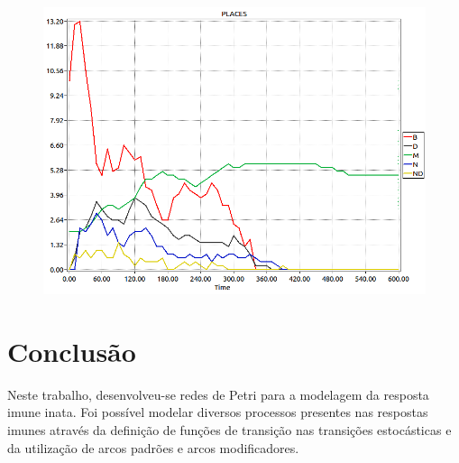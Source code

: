 \documentclass[a4paper,10pt]{article}
\begin{document}
		\begin{figure}
			\begin{center}
				\includegraphics[scale=0.45]{imagens/resultados/RedeB_N_M_D_AC_27-02_v4-Leukocytedepletion-fig1_PLACES.png}
			\end{center}
			\caption{ }
			\label{cenario3}
		\end{figure}
		
		
						
		
	\section{Conclusão}  %
	
	Neste trabalho, desenvolveu-se redes de Petri para a modelagem da resposta imune inata. Foi poss\'ivel modelar 
	diversos processos presentes nas respostas imunes atrav\'es da definiç\~ao de funç\~oes de transiç\~ao 
	nas transiç\~oes estocásticas e da utilizaç\~ao de arcos padr\~oes e arcos modificadores. 
	
\end{document}
